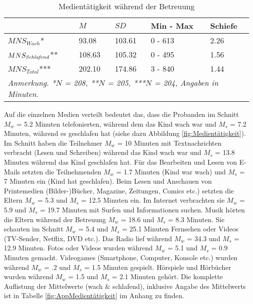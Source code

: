 \begin{table}[hb]
\centering
\captionsetup{margin=50pt, skip=5pt}
\caption{Medientätigkeit während der Betreuung}
\begin{tabular}{m{8em} m{4em}  m{4em}  m{5em} m{4em}} 
  \hline
  & $M$ & $SD$ & Min - Max & Schiefe\\
  \hline
  $MNS_{Wach}$* & 93.08 & 103.61 & 0 - 613 & 2.26\\
  $MNS_{\text{\textit{Schlafend}}}$** & 108.63 & 105.32 & 0 - 495 & 1.56\\
  $MNS_{Total}$*** & 202.10 & 174.86 & 3 - 840 & 1.44 \\
  \hline
  \multicolumn{5}{l}{\textit{Anmerkung. *$N$ = 208, **$N$ = 205, ***$N$ = 204, Angaben in Minuten.}}\\
\end{tabular}
\label{table:Medientätigkeit}
\end{table}

Auf die einzelnen Medien verteilt bedeutet das, dass die Probanden im Schnitt $M_{w}$ = 5.2 Minuten telefonierten, während dem das Kind wach war und $M_{s}$ = 7.2 Minuten, während es geschlafen hat (siehe dazu Abbildung \ref{fig:Medientätigkeit}). Im Schnitt haben die Teilnehmer $M_{w}$ = 10 Minuten mit Textnachrichten verbracht (Lesen und Schreiben) während das Kind wach war und $M_{s}$ = 13.8 Minuten während das Kind geschlafen hat. Für das Bearbeiten und Lesen von E-Mails setzten die Teilnehmenden $M_{w}$ = 1.7 Minuten (Kind war wach) und $M_{s}$ = 7 Minuten ein (Kind hat geschlafen). Beim Lesen und Anschauen von Printemedien (Bilder-)Bücher, Magazine, Zeitungen, Comics etc.) setzten die Eltern $M_{w}$ = 5.3 und $M_{s}$ = 12.5 Minuten ein. Im Internet verbrachten sie $M_{w}$ = 5.9 und $M_{s}$ = 19.7 Minuten mit Surfen und Informationen suchen. Musik hörten die Eltern während der Betreuung $M_{w}$ = 18.6 und $M_{s}$ = 8.3 Minuten. Sie schauten im Schnitt $M_{w}$ = 5.4 und $M_{s}$ = 25.1 Minuten Fernsehen oder Videos (TV-Sender, Netflix, DVD etc.). Das Radio lief während $M_{w}$ = 34.3 und $M_{s}$ = 12.9 Minuten. Fotos oder Videos wurden während $M_{w}$ = 5.1 und $M_{s}$ = 0.9 Minuten gemacht. Videogames (Smartphone, Computer, Konsole etc.) wurden während $M_{w}$ = .2 und $M_{s}$ = 1.5 Minuten gespielt. Hörspiele und Hörbücher wurden während $M_{w}$ = 1.5 und $M_{s}$ = 2.1 Minuten gehört. Die komplette Auflistung der Mittelwerte (wach \& schlafend), inklusive Angabe des  Mittelwerts ist in Tabelle \ref{fig:AppMedientätigkeit} im Anhang zu finden.

